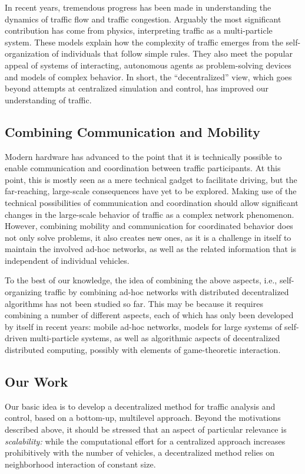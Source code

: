 \documentclass{acmrip}
\begin{document}
In recent years, tremendous progress has been made in understanding
the dynamics of traffic flow and traffic congestion. Arguably the
most significant contribution has come from physics, interpreting
traffic as a mul\-ti-par\-ti\-cle system. These models explain how
the complexity of traffic emerges from the self-organization of
individuals that follow simple rules. They also meet the popular
appeal of systems of interacting, autonomous agents as
problem-solving devices and models of complex behavior. In short,
the ``decentralized'' view, which goes beyond attempts at
centralized simulation and control, has improved our understanding
of traffic.

\subsection{Combining Communication and Mobility}
Modern hardware has advanced to the point that it is technically
possible to enable communication and coordination between traffic
participants. At this point, this is mostly seen as a mere technical
gadget to facilitate driving, but the far-reaching, large-scale
consequences have yet to be explored. Making use of the technical
possibilities of communication and coordination should allow
significant changes in the large-scale behavior of traffic as a
complex network phenomenon. However, combining mobility and
communication for coordinated behavior does not only solve problems,
it also creates new ones, as it is a challenge in itself to maintain
the involved ad-hoc networks, as well as the related information
that is independent of individual vehicles.

To the best of our knowledge, the idea of combining the above
aspects, i.e., self-organizing traffic by combining ad-hoc networks
with distributed decentralized algorithms has not been studied so
far. This may be because it requires combining a number of different
aspects, each of which has only been developed by itself in recent
years: mobile ad-hoc networks, models for large systems of
self-driven multi-particle systems, as well as algorithmic aspects
of decentralized distributed computing, possibly with elements of
game-theoretic interaction.

\subsection{Our Work}
Our basic idea is to develop a
decentralized method for traffic analysis and control, based on a
bottom-up, multilevel approach. Beyond the motivations described
above, it should be stressed that an aspect of particular relevance
is {\em scalability:} while the computational effort for a
centralized approach increases prohibitively with the number of
vehicles, a decentralized method relies on neighborhood interaction
of constant size.
\end{document}
